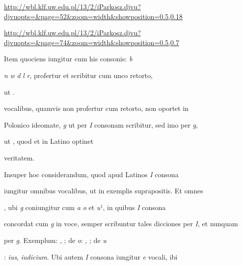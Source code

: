 
\newParkoszpage

{
\url{http://wbl.klf.uw.edu.pl/13/2/iParkosz.djvu?djvuopts=&page=52&zoom=width&showposition=0.5,0.18}

\url{http://wbl.klf.uw.edu.pl/13/2/iParkosz.djvu?djvuopts=&page=74&zoom=width&showposition=0.5,0.7}
}

\bigskip

\obeylines
\mono



\fullpreviouslines


{
\color{blue}

\indentK Item quociens iungitur cum his consonis: \textit{b} 

\textit{n} \textit{w} \textit{d} \textit{l} \textit{r}, profertur et scribitur cum unco retorto, 

}


\fulllines

ut    .

vocalibus, quamvis non profertur cum  retorto, non oportet in

Polonico ideomate, \textit{g} ut per \textit{I} consonam scribitur, sed imo per \textit{g},

ut    , quod et in Latino optinet 

\splitlines

veritatem.

\indentK Insuper hoc considerandum, quod apud Latinos \textit{I} consona 

\fulllines

iungitur omnibus vocalibus, ut in exemplis suprapositis. Et omnes 

, ubi \textit{g} coniungitur cum \textit{a} \textit{o} et \textit{u}¹, in quibus \textit{I} consona 

concordat cum \textit{g} in voce, semper scribuntur tales dicciones per \textit{I}, et nunquam 

per \textit{g}. Exemplum: , ; de \textit{o}: , ; de \textit{u}

: \textit{ius}, \textit{iudicium}. Ubi autem \textit{I} consona iungitur \textit{e} vocali, ibi

